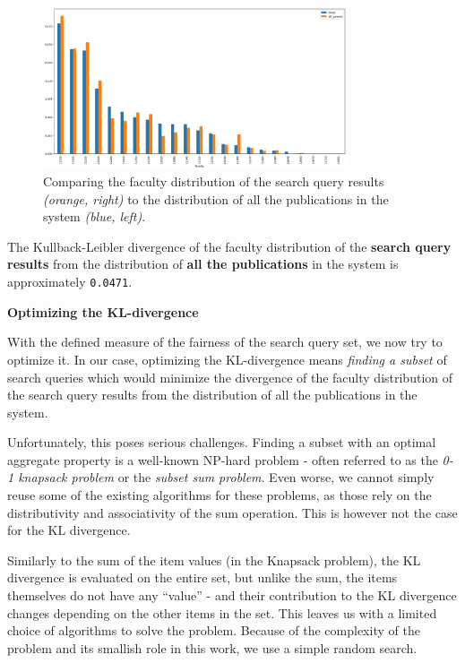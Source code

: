 \begin{figure}[ht!]
    \captionsetup{width=.9\linewidth}
    \includegraphics[width=0.8\textwidth]{../img/all-queries-vs-totals.png}
    \centering
    \caption{Comparing the faculty distribution of the search query results \textit{(orange, right)} to the distribution of all the publications in the system \textit{(blue, left)}.}
\end{figure}

The Kullback-Leibler divergence of the faculty distribution of the \textbf{search query results} from the distribution of \textbf{all the publications} in the system is approximately \texttt{0.0471}.

\textbf{Optimizing the KL-divergence}

With the defined measure of the fairness of the search query set, we now try to optimize it.
In our case, optimizing the KL-divergence means \textit{finding a subset} of search queries which would minimize the divergence of the faculty distribution of the search query results from the distribution of all the publications in the system.

Unfortunately, this poses serious challenges. 
Finding a subset with an optimal aggregate property is a well-known NP-hard problem - often referred to as the \textit{0-1 knapsack problem} or the \textit{subset sum problem}.
Even worse, we cannot simply reuse some of the existing algorithms for these problems, as those rely on the distributivity and associativity of the sum operation. 
This is however not the case for the KL divergence.

Similarly to the sum of the item values (in the Knapsack problem), the KL divergence is evaluated on the entire set, but unlike the sum, the items themselves do not have any “value” - and their contribution to the KL divergence changes depending on the other items in the set. 
This leaves us with a limited choice of algorithms to solve the problem. 
Because of the complexity of the problem and its smallish role in this work, we use a simple random search. 

